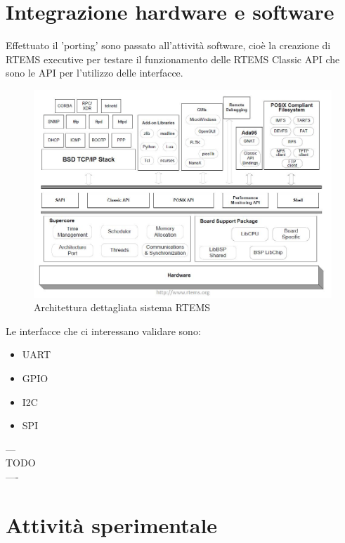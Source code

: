 \documentclass[12pt, a4paper, titlepage, oneside]{book}
\begin{document}
\begin{flushleft}
\chapter{Integrazione hardware e software}
Effettuato il 'porting' sono passato all'attività software, cioè la creazione di RTEMS executive per testare il funzionamento delle RTEMS Classic API che sono le API per l'utilizzo delle interfacce. \\
\begin{figure} [h]
\centering
    \includegraphics[scale = 0.80] {RTEMS_architecture.JPG}
    \caption{Architettura dettagliata sistema RTEMS}
    \label{fig:my_label3}
\end{figure}
Le interfacce che ci interessano validare sono:
\begin{itemize}
    \item UART
    \item GPIO
    \item I2C
    \item SPI
\end{itemize}

---\\
TODO\\
----\\

\chapter{Attività sperimentale}

\end{flushleft}
\end{document}
